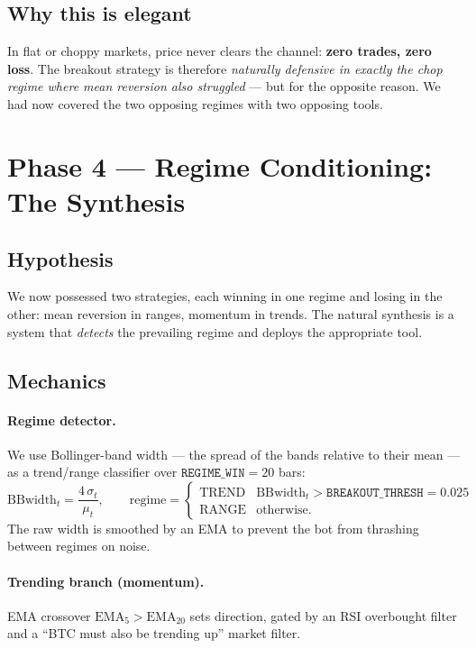 \documentclass[11pt,a4paper]{article}
\newcommand{\param}[1]{\texttt{#1}}
\begin{document}
\subsection{Why this is elegant}
In flat or choppy markets, price never clears the channel: \textbf{zero trades,
zero loss}. The breakout strategy is therefore \emph{naturally defensive in
exactly the chop regime where mean reversion also struggled} --- but for the
opposite reason. We had now covered the two opposing regimes with two opposing
tools.

\section{Phase 4 --- Regime Conditioning: The Synthesis}

\subsection{Hypothesis}
We now possessed two strategies, each winning in one regime and losing in the
other: mean reversion in ranges, momentum in trends. The natural synthesis is a
system that \emph{detects} the prevailing regime and deploys the appropriate tool.

\subsection{Mechanics}
\paragraph{Regime detector.} We use Bollinger-band width --- the spread of the
bands relative to their mean --- as a trend/range classifier over
$\param{REGIME\_WIN}=20$ bars:
\begin{equation}
  \mathrm{BBwidth}_t = \frac{4\,\sigma_t}{\mu_t},\qquad
  \text{regime} =
  \begin{cases}
    \text{TREND} & \mathrm{BBwidth}_t > \param{BREAKOUT\_THRESH}=0.025\\
    \text{RANGE} & \text{otherwise.}
  \end{cases}
\end{equation}
The raw width is smoothed by an EMA to prevent the bot from thrashing between
regimes on noise.
\paragraph{Trending branch (momentum).} EMA crossover $\mathrm{EMA}_5 >
\mathrm{EMA}_{20}$ sets direction, gated by an RSI overbought filter and a
``BTC must also be trending up'' market filter.
\end{document}
